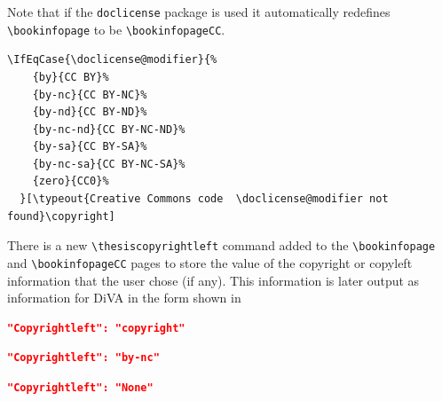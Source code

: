 Note that if the \texttt{doclicense} package is used it automatically redefines \texttt{\textbackslash bookinfopage} to be \texttt{\textbackslash bookinfopageCC}.

\begin{lstlisting}[language={[LaTeX]TeX}, caption={Case statement in \textbackslash bookinfopageCC}, label=lst:bookinfopageCCcaseSTMT]
  \IfEqCase{\doclicense@modifier}{%
    {by}{CC BY}%
    {by-nc}{CC BY-NC}%
    {by-nd}{CC BY-ND}%
    {by-nc-nd}{CC BY-NC-ND}%
    {by-sa}{CC BY-SA}%
    {by-nc-sa}{CC BY-NC-SA}%
    {zero}{CC0}%
  }[\typeout{Creative Commons code  \doclicense@modifier not found}\copyright]
\end{lstlisting}

There is a new \texttt{\textbackslash thesiscopyrightleft} command added to the \texttt{\textbackslash bookinfopage} and \texttt{\textbackslash bookinfopageCC} pages to store the value of the copyright or copyleft information that the user chose (if any). This information is later output as information for DiVA in the form shown in 
\begin{lstlisting}[language=json, caption={If the user chose to have a copyright on the bookinfo page}, label=lst:bookinfoCopyrightselected]
"Copyrightleft": "copyright"
\end{lstlisting}

\begin{lstlisting}[language=json, caption={If the user chose to have a CC BY-NC license on the bookinfo page}, label=lst:bookinfoCopyleftselected]
"Copyrightleft": "by-nc"
\end{lstlisting}

\begin{lstlisting}[language=json, caption={If the user chose \textbf{not} to have a bookinfo page}, label=lst:bookinfoNoneselected]
"Copyrightleft": "None"
\end{lstlisting}
%
